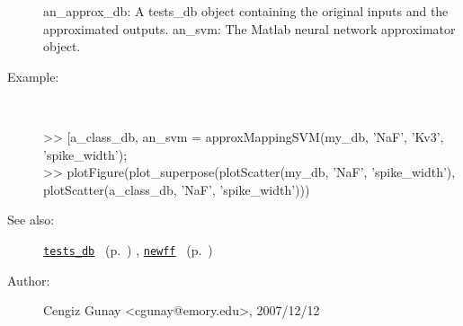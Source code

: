 \begin{description}
	an\_approx\_db: A tests\_db object containing the original inputs and
			the approximated outputs.
	an\_svm: The Matlab neural network approximator object.
%
\item[Example:]~
\begin{lyxcode} >> [a\_class\_db, an\_svm = approxMappingSVM(my\_db, {'NaF', 'Kv3'}, {'spike\_width'});
\\%
 >> plotFigure(plot\_superpose({plotScatter(my\_db, 'NaF', 'spike\_width'),
\\%
                                plotScatter(a\_class\_db, 'NaF', 'spike\_width')}))
\\%
\end{lyxcode}
%
\item[See also:]%
\hyperlink{ref_tests_db}{\texttt{tests\_db}}%
\ (p.~\pageref{ref_tests_db})%
%
, \hyperlink{ref_newff}{\texttt{newff}}%
\ (p.~\pageref{ref_newff})%
%
%
\item[Author:]%
Cengiz Gunay <cgunay@emory.edu>, 2007/12/12
%
\end{description}
\methodline%
